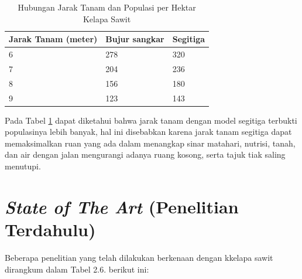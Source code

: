 \begin{enumerate}[label=(\alph*)]
\begin{enumerate}[label=(\alph*)]
\begin{enumerate}
			\begin{singlespace}
				\begin{table}[H]
					\centering
					\caption{Hubungan Jarak Tanam dan Populasi per Hektar Kelapa Sawit}
					\label{tbl:Hubungan-Jarak-Tanam-Populasi-Per-Hektar}
					\begin{tabular}{|p{4cm}|p{3cm}|p{3cm}|}
						\hline
						\rowcolor[HTML]{C0C0C0} 
						Jarak Tanam (meter) & Bujur sangkar & Segitiga \\ \hline
						6                   & 278           & 320      \\ \hline
						7                   & 204           & 236      \\ \hline
						8                   & 156           & 180      \\ \hline
						9                   & 123           & 143      \\ \hline
					\end{tabular}
				\end{table}
			\end{singlespace}
			
			Pada Tabel \ref{tbl:Hubungan-Jarak-Tanam-Populasi-Per-Hektar} dapat diketahui bahwa jarak tanam dengan model segitiga terbukti populasinya lebih banyak, hal ini disebabkan karena jarak tanam segitiga dapat memaksimalkan ruan yang ada dalam menangkap sinar matahari, nutrisi, tanah, dan air dengan jalan mengurangi adanya ruang kosong, serta tajuk tiak saling menutupi. 
			
		\end{enumerate}
		
	\end{enumerate}
\end{enumerate}

\section{\textit{State of The Art} (Penelitian Terdahulu)}
\hspace{1,2cm}Beberapa penelitian yang telah dilakukan berkenaan dengan kkelapa sawit dirangkum dalam Tabel 2.6. berikut ini: 

